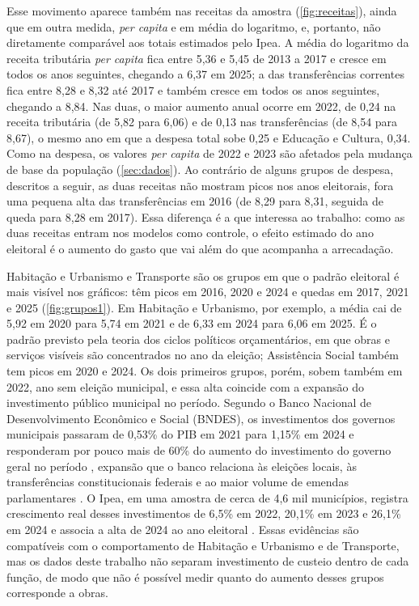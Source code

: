 Esse movimento aparece também nas receitas da amostra (\autoref{fig:receitas}), ainda que em outra medida, \textit{per capita} e em média do logaritmo, e, portanto, não diretamente comparável aos totais estimados pelo Ipea. A média do logaritmo da receita tributária \textit{per capita} fica entre 5,36 e 5,45 de 2013 a 2017 e cresce em todos os anos seguintes, chegando a 6,37 em 2025; a das transferências correntes fica entre 8,28 e 8,32 até 2017 e também cresce em todos os anos seguintes, chegando a 8,84. Nas duas, o maior aumento anual ocorre em 2022, de 0,24 na receita tributária (de 5,82 para 6,06) e de 0,13 nas transferências (de 8,54 para 8,67), o mesmo ano em que a despesa total sobe 0,25 e Educação e Cultura, 0,34. Como na despesa, os valores \textit{per capita} de 2022 e 2023 são afetados pela mudança de base da população (\autoref{sec:dados}). Ao contrário de alguns grupos de despesa, descritos a seguir, as duas receitas não mostram picos nos anos eleitorais, fora uma pequena alta das transferências em 2016 (de 8,29 para 8,31, seguida de queda para 8,28 em 2017). Essa diferença é a que interessa ao trabalho: como as duas receitas entram nos modelos como controle, o efeito estimado do ano eleitoral é o aumento do gasto que vai além do que acompanha a arrecadação.

Habitação e Urbanismo e Transporte são os grupos em que o padrão eleitoral é mais visível nos gráficos: têm picos em 2016, 2020 e 2024 e quedas em 2017, 2021 e 2025 (\autoref{fig:grupos1}). Em Habitação e Urbanismo, por exemplo, a média cai de 5,92 em 2020 para 5,74 em 2021 e de 6,33 em 2024 para 6,06 em 2025. É o padrão previsto pela teoria dos ciclos políticos orçamentários, em que obras e serviços visíveis são concentrados no ano da eleição; Assistência Social também tem picos em 2020 e 2024. Os dois primeiros grupos, porém, sobem também em 2022, ano sem eleição municipal, e essa alta coincide com a expansão do investimento público municipal no período. Segundo o Banco Nacional de Desenvolvimento Econômico e Social (BNDES), os investimentos dos governos municipais passaram de 0,53\% do PIB em 2021 para 1,15\% em 2024 e responderam por pouco mais de 60\% do aumento do investimento do governo geral no período \parencite[p.~120]{bndes2025}, expansão que o banco relaciona às eleições locais, às transferências constitucionais federais e ao maior volume de emendas parlamentares \parencite[p.~121]{bndes2025}. O Ipea, em uma amostra de cerca de 4,6 mil municípios, registra crescimento real desses investimentos de 6,5\% em 2022, 20,1\% em 2023 e 26,1\% em 2024 e associa a alta de 2024 ao ano eleitoral \parencite[p.~10]{santana2025}. Essas evidências são compatíveis com o comportamento de Habitação e Urbanismo e de Transporte, mas os dados deste trabalho não separam investimento de custeio dentro de cada função, de modo que não é possível medir quanto do aumento desses grupos corresponde a obras.

